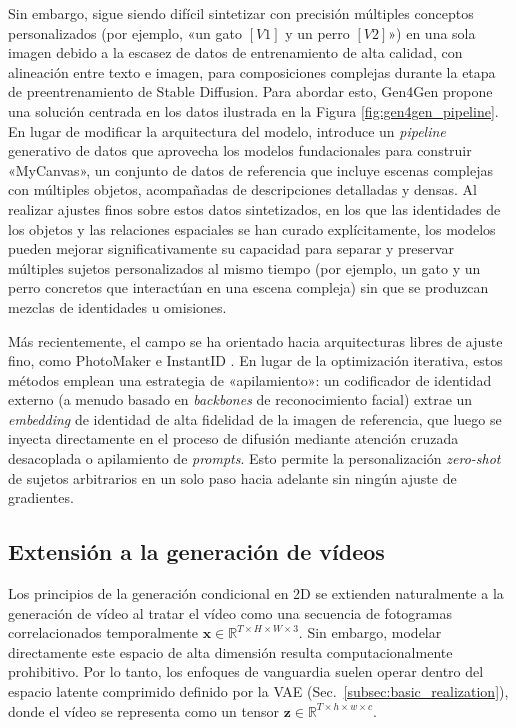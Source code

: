 \documentclass[../../book-main_es.tex]{subfiles}
\begin{document}
Sin embargo, sigue siendo difícil sintetizar con precisión múltiples conceptos personalizados 
(por ejemplo, «un gato $[V1]$ y un perro $[V2]$») en una sola imagen debido a la escasez de datos 
de entrenamiento de alta calidad, con alineación entre texto e imagen, para composiciones complejas 
durante la etapa de preentrenamiento de Stable Diffusion. Para abordar esto, 
Gen4Gen \cite{yeh2024gen4gen} propone una solución centrada en los datos ilustrada en la 
Figura \ref{fig:gen4gen_pipeline}. En lugar de modificar la arquitectura del modelo, introduce un 
\textit{pipeline} generativo de datos que aprovecha los modelos fundacionales para construir «MyCanvas», un conjunto de 
datos de referencia que incluye escenas complejas con múltiples objetos, acompañadas de descripciones 
detalladas y densas. Al realizar ajustes finos sobre estos datos sintetizados, en los que las 
identidades de los objetos y las relaciones espaciales se han curado explícitamente, los 
modelos pueden mejorar significativamente su capacidad para separar y preservar múltiples sujetos 
personalizados al mismo tiempo (por ejemplo, un gato y un perro concretos que interactúan en una 
escena compleja) sin que se produzcan mezclas de identidades u omisiones.

Más recientemente, el campo se ha orientado hacia arquitecturas libres de ajuste fino, como 
PhotoMaker \cite{li2024photomaker} e InstantID \cite{wang2024instantid}. En lugar de la optimización 
iterativa, estos métodos emplean una estrategia de «apilamiento»: un codificador de identidad externo 
(a menudo basado en \textit{backbones} de reconocimiento facial) extrae un \textit{embedding} de identidad de alta 
fidelidad de la imagen de referencia, que luego se inyecta directamente en el proceso de difusión 
mediante atención cruzada desacoplada o apilamiento de \textit{prompts}. Esto permite la personalización \textit{zero-shot} 
de sujetos arbitrarios en un solo paso hacia adelante sin ningún ajuste de gradientes.

\subsection{Extensión a la generación de vídeos}
\label{subsec:video_gen}

Los principios de la generación condicional en 2D se extienden naturalmente a la generación de 
vídeo al tratar el vídeo como una secuencia de fotogramas correlacionados temporalmente 
$\boldsymbol{x} \in \mathbb{R}^{T \times H \times W \times 3}$. Sin embargo, modelar directamente 
este espacio de alta dimensión resulta computacionalmente prohibitivo. Por lo tanto, los enfoques 
de vanguardia suelen operar dentro del espacio latente comprimido definido por la VAE 
(Sec.~\ref{subsec:basic_realization}), donde el vídeo se representa como un tensor 
$\boldsymbol{z} \in \mathbb{R}^{T \times h \times w \times c}$.
\end{document}
